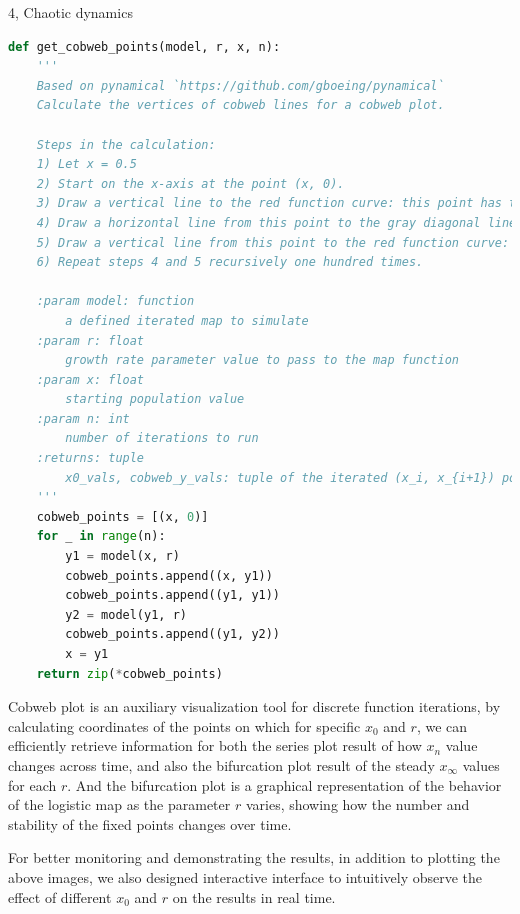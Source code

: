 \documentclass[10pt,a4paper]{article}
\begin{document}
\begin{task}{4, Chaotic dynamics}
\begin{lstlisting}[language = Python, label = {cusp_method}]
def get_cobweb_points(model, r, x, n):
    '''
    Based on pynamical `https://github.com/gboeing/pynamical`
    Calculate the vertices of cobweb lines for a cobweb plot.

    Steps in the calculation:
    1) Let x = 0.5
    2) Start on the x-axis at the point (x, 0).
    3) Draw a vertical line to the red function curve: this point has the coordinates (x, f(x)).
    4) Draw a horizontal line from this point to the gray diagonal line: this point has the coordinates (f(x), f(x)).
    5) Draw a vertical line from this point to the red function curve: this point has the coordinates (f(x), f(f(x))).
    6) Repeat steps 4 and 5 recursively one hundred times.

    :param model: function
        a defined iterated map to simulate
    :param r: float
        growth rate parameter value to pass to the map function
    :param x: float
        starting population value
    :param n: int
        number of iterations to run
    :returns: tuple
        x0_vals, cobweb_y_vals: tuple of the iterated (x_i, x_{i+1}) position series
    '''
    cobweb_points = [(x, 0)]
    for _ in range(n):
        y1 = model(x, r)
        cobweb_points.append((x, y1))
        cobweb_points.append((y1, y1))
        y2 = model(y1, r)
        cobweb_points.append((y1, y2))
        x = y1
    return zip(*cobweb_points)
\end{lstlisting}

Cobweb plot is an auxiliary visualization tool for discrete function iterations, by calculating coordinates of the points on which for specific $x_0$ and $r$, we can efficiently retrieve information for both the series plot result of how $x_n$ value changes across time, and also the bifurcation plot result of the steady $x_\infty$ values for each $r$. And the bifurcation plot is a graphical representation of the behavior of the logistic map as the parameter $r$ varies, showing how the number and stability of the fixed points changes over time.

For better monitoring and demonstrating the results, in addition to plotting the above images, we also designed interactive interface to intuitively observe the effect of different $x_0$ and $r$ on the results in real time.


\end{task}
\end{document}
